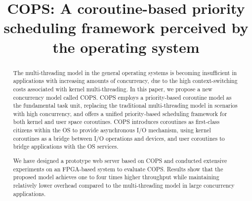 \documentclass[conference]{IEEEtran}
\makeatletter
\newcommand{\linebreakand}{%
  \end{@IEEEauthorhalign}
  \hfill\mbox{}\par
  \mbox{}\hfill\begin{@IEEEauthorhalign}
}
\makeatother
\begin{document}
\title{COPS: A coroutine-based priority scheduling framework perceived by the operating system}

\author{}


\maketitle

\begin{abstract}
The multi-threading model in the general operating systems is becoming insufficient in applications with increasing amounts of concurrency, due to the high context-switching costs associated with kernel multi-threading. In this paper, we propose a new concurrency model called COPS. COPS employs a priority-based coroutine model as the fundamental task unit, replacing the traditional multi-threading model in scenarios with high concurrency, and offers a unified priority-based scheduling framework for both kernel and user space coroutines. COPS introduces coroutines as first-class citizens within the OS to provide asynchronous I/O mechanism, using kernel coroutines as a bridge between I/O operations and devices, and user coroutines to bridge applications with the OS services.

We have designed a prototype web server based on COPS and conducted extensive experiments on an FPGA-based system to evaluate COPS. Results show that the proposed model achieves one to four times higher throughput while maintaining relatively lower overhead compared to the multi-threading model in large concurrency applications.
\end{abstract}
\end{document}
